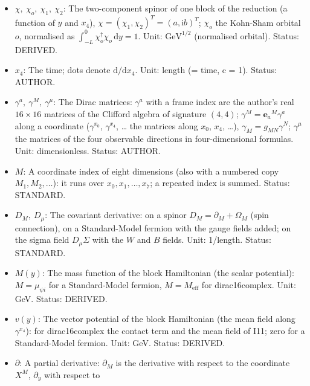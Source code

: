 \documentclass[
  10pt,
]{article}
\begin{document}
\begin{itemize}
  \(\mathcal{V}\): The constant \(16 \times 2\) matrix of the reduction
  ansatz that places the two-component spinor \(\chi\) of one block into
  the 16 components of the eight-dimensional spinor. Unit:
  dimensionless. Status: DERIVED.
\item
  \(\chi,\ \chi_o,\ \chi_1,\ \chi_2\): The two-component spinor of one
  block of the reduction (a function of \(y\) and \(x_4\)),
  \(\chi = (\chi_1, \chi_2)^T = (a, \mathrm{i}b)^T\); \(\chi_o\) the
  Kohn-Sham orbital \(o\), normalised as
  \(\int_{-L}^{0}\chi_o^\dagger\chi_o\,\mathrm{d}y = 1\). Unit:
  \(\mathrm{GeV}^{1/2}\) (normalised orbital). Status: DERIVED.
\item
  \(x_4\): The time; dots denote \(\mathrm{d}/\mathrm{d}x_4\). Unit:
  length (= time, c = 1). Status: AUTHOR.
\item
  \(\gamma^a,\ \gamma^M,\ \gamma^\mu\): The Dirac matrices: \(\gamma^a\)
  with a frame index are the author's real \(16 \times 16\) matrices of
  the Clifford algebra of signature \((4, 4)\);
  \(\gamma^M = \mathbf{e}_a{}^M\gamma^a\) along a coordinate
  (\(\gamma^{x_0}\), \(\gamma^{x_4}\), \ldots{} the matrices along
  \(x_0\), \(x_4\), \ldots), \(\gamma_M = g_{MN}\gamma^N\);
  \(\gamma^\mu\) the matrices of the four observable directions in
  four-dimensional formulas. Unit: dimensionless. Status: AUTHOR.
\item
  \(M\): A coordinate index of eight dimensions (also with a numbered
  copy \(M_1, M_2, \dots\)): it runs over \(x_0, x_1, \dots, x_7\); a
  repeated index is summed. Status: STANDARD.
\item
  \(D_M,\ D_\mu\): The covariant derivative: on a spinor
  \(D_M = \partial_M + \Omega_M\) (spin connection), on a Standard-Model
  fermion with the gauge fields added; on the sigma field
  \(D_\mu\Sigma\) with the \(W\) and \(B\) fields. Unit: 1/length.
  Status: STANDARD.
\item
  \(M(y)\): The mass function of the block Hamiltonian (the scalar
  potential): \(M = \mu_{\psi i}\) for a Standard-Model fermion,
  \(M = M_{\mathrm{eff}}\) for dirac16complex. Unit: GeV. Status:
  DERIVED.
\item
  \(v(y)\): The vector potential of the block Hamiltonian (the mean
  field along \(\gamma^{x_4}\)): for dirac16complex the contact term and
  the mean field of I11; zero for a Standard-Model fermion. Unit: GeV.
  Status: DERIVED.
\item
  \(\partial\): A partial derivative: \(\partial_M\) is the derivative
  with respect to the coordinate \(X^M\), \(\partial_y\) with respect to

\end{itemize}
\end{document}
